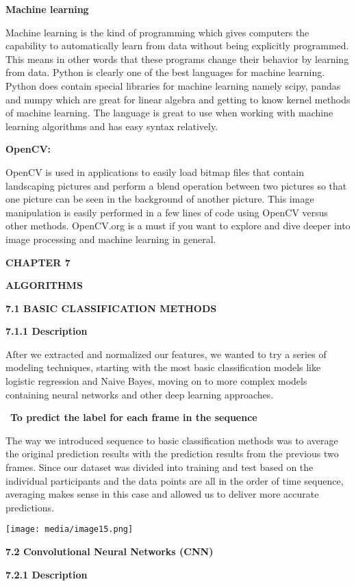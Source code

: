 \documentclass[a4paper,12pt]{article}
\begin{document}
\textbf{Machine learning}

Machine learning is the kind of programming which gives computers the
capability to automatically learn from data without being explicitly
programmed. This means in other words that these programs change their
behavior by learning from data. Python is clearly one of the best
languages for machine learning. Python does contain special libraries
for machine learning namely scipy, pandas and numpy which are great for
linear algebra and getting to know kernel methods of machine learning.
The language is great to use when working with machine learning
algorithms and has easy syntax relatively.

\textbf{OpenCV:}

OpenCV is used in applications to easily load bitmap files that contain
landscaping pictures and perform a blend operation between two pictures
so that one picture can be seen in the background of another picture.
This image manipulation is easily performed in a few lines of code using
OpenCV versus other methods. OpenCV.org is a must if you want to explore
and dive deeper into image processing and machine learning in general.

\textbf{CHAPTER 7}

\textbf{ALGORITHMS}

\textbf{7.1 BASIC CLASSIFICATION METHODS}

\textbf{7.1.1 Description}

After we extracted and normalized our features, we wanted to try a
series of modeling techniques, starting with the most basic
classification models like logistic regression and Naive Bayes, moving
on to more complex models containing neural networks and other deep
learning approaches.

~\textbf{To predict the label for each frame in the sequence}

The way we introduced sequence to basic classification methods was to
average the original prediction results with the prediction results from
the previous two frames. Since our dataset was divided into training and
test based on the individual participants and the data points are all in
the order of time sequence, averaging makes sense in this case and
allowed us to deliver more accurate predictions.

\texttt{[image: media/image15.png]}

\textbf{7.2 Convolutional Neural Networks (CNN)}

\textbf{7.2.1 Description}
\end{document}
